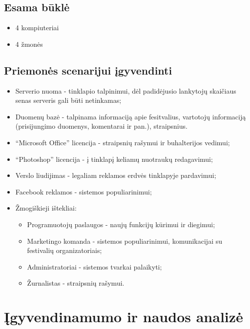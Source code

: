 \documentclass{VUMIFPSkursinis}
\begin{document}
\subsection{Esama būklė}
\begin{itemize}
	\item 4 kompiuteriai
	\item 4 žmonės
\end{itemize}

\subsection{Priemonės scenarijui įgyvendinti}
\begin{itemize}
\item Serverio nuoma - tinklapio talpinimui, dėl padidėjusio lankytojų skaičiaus senas serveris gali būti netinkamas;
\item Duomenų bazė - talpinama informaciją apie fesitvalius, vartotojų informaciją (prisijungimo duomenys, komentarai ir pan.), straipsnius.
\item “Microsoft Office” licencija - straipsnių rašymui ir buhalterijos vedimui;
\item “Photoshop” licencija - į tinklapį keliamų nuotraukų redagavimui;
\item Verslo liudijimas - legaliam reklamos erdvės tinklapyje pardavimui;
\item Facebook reklamos - sistemos populiarinimui;
\item Žmogiškieji ištekliai:
    \begin{itemize}
    \item Programuotojų paslaugos - naujų funkcijų kūrimui ir diegimui;
    \item Marketingo komanda - sistemos populiarinimui, komunikacijai su festivalių organizatoriais;
    \item Administratoriai - sistemos tvarkai palaikyti;
    \item Žurnalistas - straipsnių rašymui.
    \end{itemize}
\end{itemize}

\section{Įgyvendinamumo ir naudos analizė}
\end{document}
